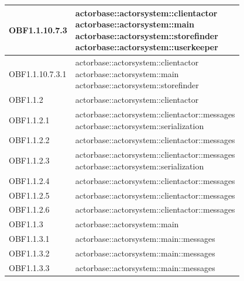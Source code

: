 \documentclass{scalatekids-article}
\begin{document}
\begin{longtable}[H]{|p{3.5cm}|p{7.5cm}|}
\hline
OBF1.1.10.7.3 & \multiLineCell[t]{actorbase::actorsystem::clientactor\\actorbase::actorsystem::main\\actorbase::actorsystem::storefinder\\actorbase::actorsystem::userkeeper\\}\\
\hline
OBF1.1.10.7.3.1 & \multiLineCell[t]{actorbase::actorsystem::clientactor\\actorbase::actorsystem::main\\actorbase::actorsystem::storefinder\\}\\
\hline
OBF1.1.2 & \multiLineCell[t]{actorbase::actorsystem::clientactor\\}\\
\hline
OBF1.1.2.1 & \multiLineCell[t]{actorbase::actorsystem::clientactor::messages\\actorbase::actorsystem::serialization\\}\\
\hline
OBF1.1.2.2 & \multiLineCell[t]{actorbase::actorsystem::clientactor::messages\\}\\
\hline
OBF1.1.2.3 & \multiLineCell[t]{actorbase::actorsystem::clientactor::messages\\actorbase::actorsystem::serialization\\}\\
\hline
OBF1.1.2.4 & \multiLineCell[t]{actorbase::actorsystem::clientactor::messages\\}\\
\hline
OBF1.1.2.5 & \multiLineCell[t]{actorbase::actorsystem::clientactor::messages\\}\\
\hline
OBF1.1.2.6 & \multiLineCell[t]{actorbase::actorsystem::clientactor::messages\\}\\
\hline
OBF1.1.3 & \multiLineCell[t]{actorbase::actorsystem::main\\}\\
\hline
OBF1.1.3.1 & \multiLineCell[t]{actorbase::actorsystem::main::messages\\}\\
\hline
OBF1.1.3.2 & \multiLineCell[t]{actorbase::actorsystem::main::messages\\}\\
\hline
OBF1.1.3.3 & \multiLineCell[t]{actorbase::actorsystem::main::messages\\}\\

\end{longtable}
\end{document}
